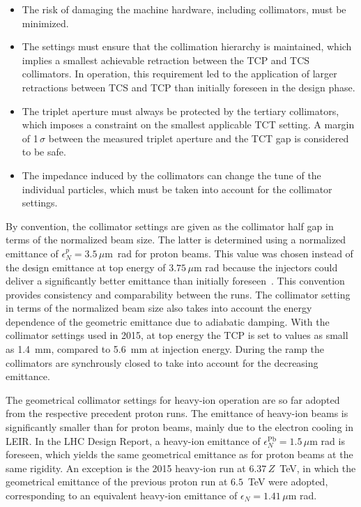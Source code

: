 \begin{itemize}
  \item The risk of damaging the machine hardware, including collimators, must be minimized.
  \item The settings must ensure that the collimation hierarchy is maintained, which implies a smallest achievable retraction between the TCP and TCS collimators. In operation, this requirement led to the application of larger retractions between TCS and TCP than initially foreseen in the design phase.
  \item The triplet aperture must always be protected by the tertiary collimators, which imposes a constraint on the smallest applicable TCT setting. A margin of 1$\,\sigma$ between the measured triplet aperture and the TCT gap is considered to be safe. 
  \item The impedance induced by the collimators can change the tune of the individual particles, which must be taken into account for the collimator settings.
\end{itemize}
%
By convention, the collimator settings are given as the collimator half gap in terms of the normalized beam size. The latter is determined using a normalized emittance of \mbox{$\epsilon_N^p = 3.5\,\mu$m rad} for proton beams. This value was chosen instead of the design emittance at top energy of $3.75\,\mu$m rad because the injectors could deliver a significantly better emittance than initially foreseen~\cite{}. This convention provides consistency and comparability between the runs. The collimator setting in terms of the normalized beam size also takes into account the energy dependence of the geometric emittance due to adiabatic damping. With the collimator settings used in 2015, at top energy the TCP is set to values as small as 1.4~mm, compared to 5.6~mm at injection energy. During the ramp the collimators are synchrously closed to take into account for the decreasing emittance. 

The geometrical collimator settings for heavy-ion operation are so far adopted from the respective precedent proton runs. The emittance of heavy-ion beams is significantly smaller than for proton beams, mainly due to the electron cooling in LEIR. In the LHC Design Report, a heavy-ion emittance of $\epsilon_N^{\text{Pb}} = 1.5\,\mu$m rad is foreseen, which yields the same geometrical emittance as for proton beams at the same rigidity. An exception is the 2015 heavy-ion run at $6.37\,Z$~TeV, in which the geometrical emittance of the previous proton run at $6.5$~TeV were adopted, corresponding to an equivalent heavy-ion emittance of $\epsilon_N = 1.41\,\mu$m rad. 
%
% 
% 



